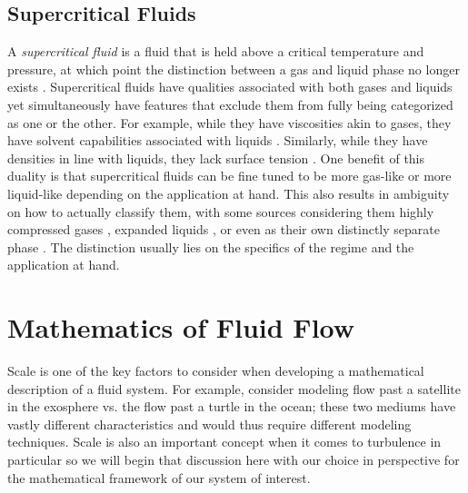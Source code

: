 %

\subsection{Supercritical Fluids}

A \textit{supercritical fluid} is a fluid that is held above a critical temperature and pressure, at which point the distinction between a gas and liquid phase no longer exists \cite{SCF2, SCF1}. Supercritical fluids have qualities associated with both gases and liquids yet simultaneously have features that exclude them from fully being categorized as one or the other. For example, while they have viscosities akin to gases, they have solvent capabilities associated with liquids \cite{}. Similarly, while they have densities in line with liquids, they lack surface tension \cite{}. One benefit of this duality is that supercritical fluids can be fine tuned to be more gas-like or more liquid-like depending on the application at hand. This also results in ambiguity on how to actually classify them, with some sources considering them highly compressed gases \cite{Gordon}, expanded liquids \cite{Aggarwal}, or even as their own distinctly separate phase \cite{BANUTI201512}. The distinction usually lies on the specifics of the regime and the application at hand. 


\section{Mathematics of Fluid Flow}

Scale is one of the key factors to consider when developing a mathematical description of a fluid system. For example, consider modeling flow past a satellite in the exosphere vs. the flow past a turtle in the ocean; these two mediums have vastly different characteristics and would thus require different modeling techniques. Scale is also an important concept when it comes to turbulence in particular so we will begin that discussion here with our choice in perspective for the mathematical framework of our system of interest.

